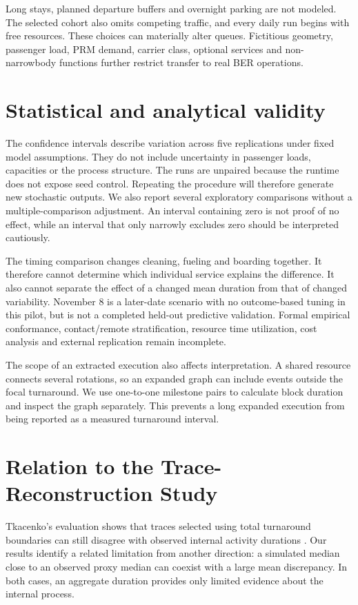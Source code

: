 Long stays, planned departure buffers and overnight parking are not modeled. The selected cohort also omits competing traffic, and every daily run begins with free resources. These choices can materially alter queues. Fictitious geometry, passenger load, PRM demand, carrier class, optional services and non-narrowbody functions further restrict transfer to real BER operations.

\section{Statistical and analytical validity}
The confidence intervals describe variation across five replications under fixed model assumptions. They do not include uncertainty in passenger loads, capacities or the process structure. The runs are unpaired because the runtime does not expose seed control. Repeating the procedure will therefore generate new stochastic outputs. We also report several exploratory comparisons without a multiple-comparison adjustment. An interval containing zero is not proof of no effect, while an interval that only narrowly excludes zero should be interpreted cautiously.

The timing comparison changes cleaning, fueling and boarding together. It therefore cannot determine which individual service explains the difference. It also cannot separate the effect of a changed mean duration from that of changed variability. November 8 is a later-date scenario with no outcome-based tuning in this pilot, but is not a completed held-out predictive validation. Formal empirical conformance, contact/remote stratification, resource time utilization, cost analysis and external replication remain incomplete.

The scope of an extracted execution also affects interpretation. A shared resource connects several rotations, so an expanded graph can include events outside the focal turnaround. We use one-to-one milestone pairs to calculate block duration and inspect the graph separately. This prevents a long expanded execution from being reported as a measured turnaround interval.

\section{Relation to the Trace-Reconstruction Study}
Tkacenko's evaluation shows that traces selected using total turnaround boundaries can still disagree with observed internal activity durations \cite[Section~6.2]{tkacenko2026}. Our results identify a related limitation from another direction: a simulated median close to an observed proxy median can coexist with a large mean discrepancy. In both cases, an aggregate duration provides only limited evidence about the internal process.


